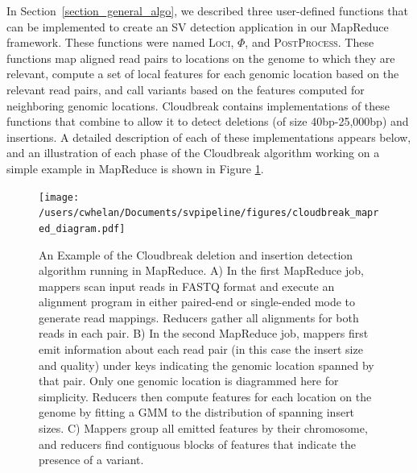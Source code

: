 In Section~\ref{section_general_algo}, we described three user-defined functions that can be implemented to create an SV detection application in our MapReduce framework. These functions were named \textsc{Loci}, $\Phi$, and \textsc{PostProcess}. These functions map aligned read pairs to locations on the genome to which they are relevant, compute a set of local features for each genomic location based on the relevant read pairs, and call variants based on the features computed for neighboring genomic locations. Cloudbreak contains implementations of these functions that combine to allow it to detect deletions (of size 40bp-25,000bp) and insertions. A detailed description of each of these implementations appears below, and an illustration of each phase of the Cloudbreak algorithm working on a simple example in MapReduce is shown in Figure \ref{cloudbreak_example}.

\begin{figure}
\centering
\texttt{[image: /users/cwhelan/Documents/svpipeline/figures/cloudbreak\_mapred\_diagram.pdf]}
\caption[An Example of the Cloudbreak deletion and insertion detection algorithm running in MapReduce.]{An Example of the Cloudbreak deletion and insertion detection algorithm running in MapReduce. A) In the first MapReduce job, mappers scan input reads in FASTQ format and execute an alignment program in either paired-end or single-ended mode to generate read mappings. Reducers gather all alignments for both reads in each pair. B) In the second MapReduce job, mappers first emit information about each read pair (in this case the insert size and quality) under keys indicating the genomic location spanned by that pair. Only one genomic location is diagrammed here for simplicity. Reducers then compute features for each location on the genome by fitting a GMM to the distribution of spanning insert sizes. C) Mappers group all emitted features by their chromosome, and reducers find contiguous blocks of features that indicate the presence of a variant.}
\label{cloudbreak_example}
\end{figure}

